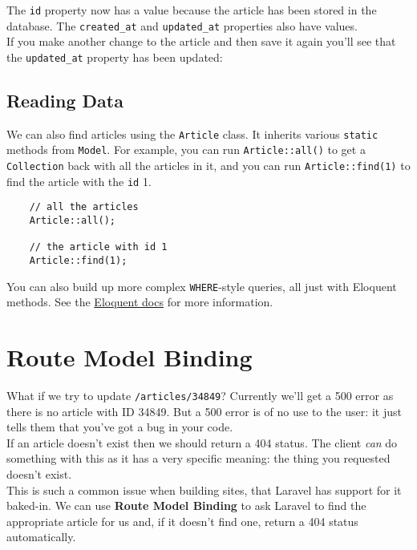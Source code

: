 
The \texttt{id} property now has a value because the article has been stored in the database. The \texttt{created\_at} and \texttt{updated\_at} properties also have values.
\\

If you make another change to the article and then save it again you'll see that the \texttt{updated\_at} property has been updated:



\subsection{Reading Data}

We can also find articles using the \texttt{Article} class. It inherits various \texttt{static} methods from \texttt{Model}. For example, you can run \texttt{Article::all()} to get a \texttt{Collection} back with all the articles in it, and you can run \texttt{Article::find(1)} to find the article with the \texttt{id} 1.

\begin{verbatim}
    // all the articles
    Article::all();

    // the article with id 1
    Article::find(1);
\end{verbatim}

You can also build up more complex \texttt{WHERE}-style queries, all just with Eloquent methods. See the \href{http://laravel.com/docs/master/eloquent}{Eloquent docs} for more information.



\section{Route Model Binding}

What if we try to update \texttt{/articles/34849}? Currently we'll get a 500 error as there is no article with ID 34849. But a 500 error is of no use to the user: it just tells them that you've got a bug in your code.
\\

If an article doesn't exist then we should return a 404 status. The client \textit{can} do something with this as it has a very specific meaning: the thing you requested doesn't exist.
\\

This is such a common issue when building sites, that Laravel has support for it baked-in. We can use \textbf{Route Model Binding} to ask Laravel to find the appropriate article for us and, if it doesn't find one, return a 404 status automatically.
\\

